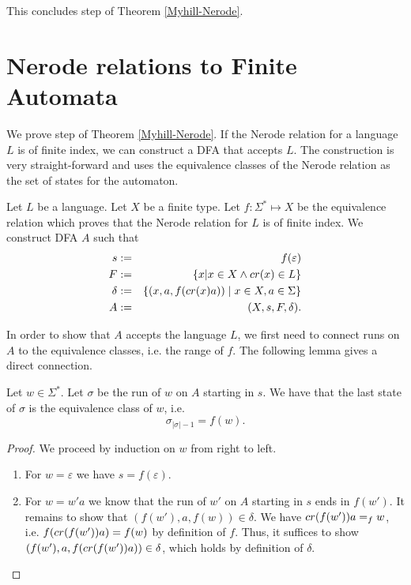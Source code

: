 This concludes step  of Theorem \ref{Myhill-Nerode}.

\section{Nerode relations to Finite Automata}
We prove step  of Theorem \ref{Myhill-Nerode}. 
If the Nerode relation for a language $L$ is of finite index, we can construct a DFA that accepts $L$.
The construction is very straight-forward and uses the equivalence classes of the Nerode relation as the set of states for the automaton.

\begin{definition}
    \label{nerode_to_dfa} 
    Let $L$ be a language. Let $X$ be a finite type. Let $f: \Sigma^* \mapsto X$ be the equivalence relation which proves that the Nerode relation for $L$ is of finite index.
    We construct DFA $A$ such that
\begin{eqnarray*}
    s & := & f(\varepsilon) \\
    F & := & \{ x | x \in X \wedge cr(x) \in L \} \\
    \delta & := & \{ (x, a, f(cr(x) a)) \; | \; x \in X, a \in \Sigma \} \\
    A &:=&  (X, s, F, \delta).
\end{eqnarray*}
\end{definition}



In order to show that $A$ accepts the language $L$, we first need to connect runs on $A$ to the equivalence classes, i.e. the range of $f$.
The following lemma gives a direct connection.

\begin{lemma}
    \label{nerode_to_dfa_run}
    Let $w \in \Sigma^*$. Let $\sigma$ be the run of $w$ on $A$ starting in $s$. We have that the last state of $\sigma$ is the equivalence class of $w$, i.e. 
    \begin{equation*}
        \sigma_{|\sigma|-1} = f(w).
    \end{equation*}
\end{lemma}
\begin{proof}
    We proceed by induction on $w$ from right to left.
    \begin{enumerate}
        \item For $w = \varepsilon$ we have $s = f(\varepsilon)$.
        \item For $w = w'a$ we know that the run of $w'$ on $A$ starting in $s$ ends in $f(w')$. 
            It remains to show that $(f(w'), a, f(w)) \in \delta$.
            We have $cr(f(w'))a =_f w$, i.e. $f(cr(f(w'))a) = f(w)$ by definition of $f$.
            Thus, it suffices to show $(f(w'), a, f(cr(f(w'))a)) \in \delta$, which holds by definition of $\delta$.
    \end{enumerate}
\end{proof}

